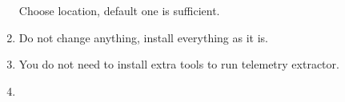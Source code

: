 \documentclass[a4paper,12pt]{book}
\begin{document}
\begin{enumerate}
\begin{minipage}[t]{\linewidth}
{		}		
		\medskip	
	\end{minipage}
	Choose location, default one is sufficient.
	\item \begin{minipage}[t]{\linewidth}
		\raggedright
		\medskip	
	\end{minipage}
	Do not change anything, install everything as it is.
	\item \begin{minipage}[t]{\linewidth}
		\raggedright
		\medskip	
	\end{minipage}
	You do not need to install extra tools to run telemetry extractor.
	\item \begin{minipage}[t]{\linewidth}
		\raggedright
\end{minipage}
\end{enumerate}
\end{document}

